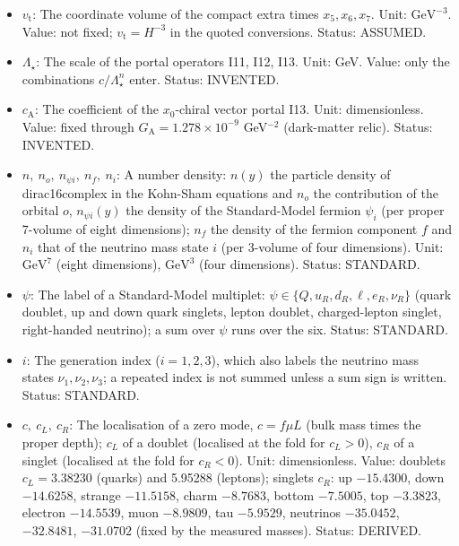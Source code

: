 \documentclass[
  10pt,
]{article}
\begin{document}
\begin{itemize}
  direction and the extra times, \(f = \mathrm{e}^{-a_4}b_4^{1/2}\) (the
  block is \(f^2\) times a four-dimensional space of constant curvature
  \(-H^2\)). Unit: dimensionless. Status: DERIVED.
\item
  \(v_{\mathrm{t}}\): The coordinate volume of the compact extra times
  \(x_5, x_6, x_7\). Unit: \(\mathrm{GeV}^{-3}\). Value: not fixed;
  \(v_{\mathrm{t}} = H^{-3}\) in the quoted conversions. Status:
  ASSUMED.
\item
  \(\Lambda_\star\): The scale of the portal operators I11, I12, I13.
  Unit: GeV. Value: only the combinations \(c/\Lambda_\star^n\) enter.
  Status: INVENTED.
\item
  \(c_{\mathrm{A}}\): The coefficient of the \(x_0\)-chiral vector
  portal I13. Unit: dimensionless. Value: fixed through
  \(G_{\mathrm{A}} = 1.278\times10^{-9}\) GeV\(^{-2}\) (dark-matter
  relic). Status: INVENTED.
\item
  \(n,\ n_o,\ n_{\psi i},\ n_f,\ n_i\): A number density: \(n(y)\) the
  particle density of dirac16complex in the Kohn-Sham equations and
  \(n_o\) the contribution of the orbital \(o\), \(n_{\psi i}(y)\) the
  density of the Standard-Model fermion \(\psi_i\) (per proper 7-volume
  of eight dimensions); \(n_f\) the density of the fermion component
  \(f\) and \(n_i\) that of the neutrino mass state \(i\) (per 3-volume
  of four dimensions). Unit: \(\mathrm{GeV}^{7}\) (eight dimensions),
  \(\mathrm{GeV}^{3}\) (four dimensions). Status: STANDARD.
\item
  \(\psi\): The label of a Standard-Model multiplet:
  \(\psi \in \{Q, u_R, d_R, \ell, e_R, \nu_R\}\) (quark doublet, up and
  down quark singlets, lepton doublet, charged-lepton singlet,
  right-handed neutrino); a sum over \(\psi\) runs over the six. Status:
  STANDARD.
\item
  \(i\): The generation index (\(i = 1, 2, 3\)), which also labels the
  neutrino mass states \(\nu_1, \nu_2, \nu_3\); a repeated index is not
  summed unless a sum sign is written. Status: STANDARD.
\item
  \(c,\ c_L,\ c_R\): The localisation of a zero mode, \(c = f\mu L\)
  (bulk mass times the proper depth); \(c_L\) of a doublet (localised at
  the fold for \(c_L > 0\)), \(c_R\) of a singlet (localised at the fold
  for \(c_R < 0\)). Unit: dimensionless. Value: doublets
  \(c_L = 3.38230\) (quarks) and 5.95288 (leptons); singlets \(c_R\): up
  \(-15.4300\), down \(-14.6258\), strange \(-11.5158\), charm
  \(-8.7683\), bottom \(-7.5005\), top \(-3.3823\), electron
  \(-14.5539\), muon \(-8.9809\), tau \(-5.9529\), neutrinos
  \(-35.0452\), \(-32.8481\), \(-31.0702\) (fixed by the measured
  masses). Status: DERIVED.
\end{itemize}
\end{document}

